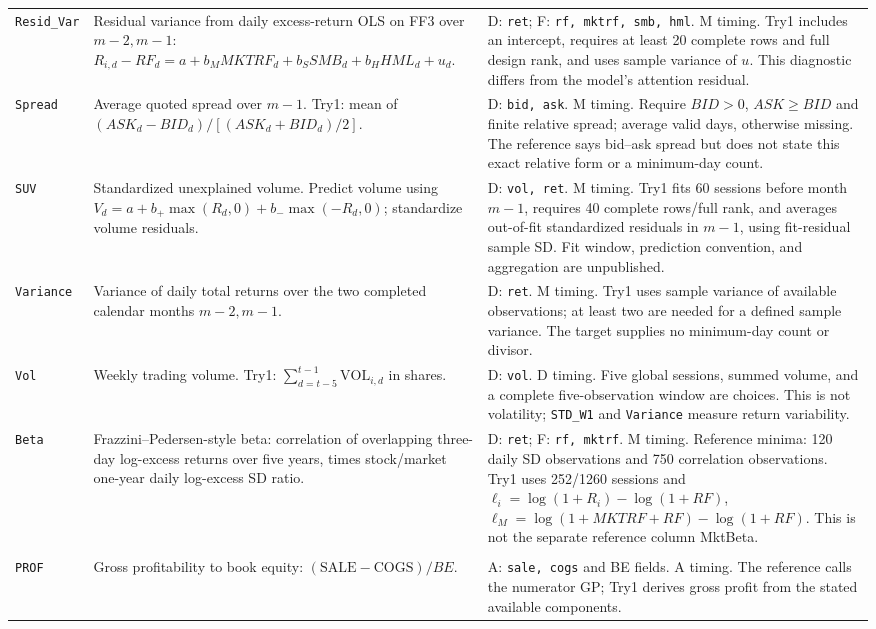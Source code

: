 \documentclass[11pt]{article}
\begin{document}
\begin{longtable}{@{}>{\raggedright\arraybackslash}p{}>{\raggedright\arraybackslash}p{}>{\raggedright\arraybackslash}p{}@{}}
\texttt{Resid\_Var} & Residual variance from daily excess-return OLS on FF3 over $m-2,m-1$: $R_{i,d}-RF_d=a+b_M MKTRF_d+b_S SMB_d+b_H HML_d+u_d$. & D: \texttt{ret}; F: \texttt{rf, mktrf, smb, hml}. M timing. Try1 includes an intercept, requires at least 20 complete rows and full design rank, and uses sample variance of $u$. This diagnostic differs from the model's attention residual. \\
\texttt{Spread} & Average quoted spread over $m-1$. Try1: mean of $(ASK_d-BID_d)/[(ASK_d+BID_d)/2]$. & D: \texttt{bid, ask}. M timing. Require $BID>0$, $ASK\ge BID$ and finite relative spread; average valid days, otherwise missing. The reference says bid--ask spread but does not state this exact relative form or a minimum-day count. \\
\texttt{SUV} & Standardized unexplained volume. Predict volume using $V_d=a+b_+\max(R_d,0)+b_-\max(-R_d,0)$; standardize volume residuals. & D: \texttt{vol, ret}. M timing. Try1 fits 60 sessions before month $m-1$, requires 40 complete rows/full rank, and averages out-of-fit standardized residuals in $m-1$, using fit-residual sample SD. Fit window, prediction convention, and aggregation are unpublished. \\
\texttt{Variance} & Variance of daily total returns over the two completed calendar months $m-2,m-1$. & D: \texttt{ret}. M timing. Try1 uses sample variance of available observations; at least two are needed for a defined sample variance. The target supplies no minimum-day count or divisor. \\
\texttt{Vol} & Weekly trading volume. Try1: $\sum_{d=t-5}^{t-1}\mathrm{VOL}_{i,d}$ in shares. & D: \texttt{vol}. D timing. Five global sessions, summed volume, and a complete five-observation window are choices. This is not volatility; \texttt{STD\_W1} and \texttt{Variance} measure return variability. \\
\texttt{Beta} & Frazzini--Pedersen-style beta: correlation of overlapping three-day log-excess returns over five years, times stock/market one-year daily log-excess SD ratio. & D: \texttt{ret}; F: \texttt{rf, mktrf}. M timing. Reference minima: 120 daily SD observations and 750 correlation observations. Try1 uses 252/1260 sessions and $\ell_i=\log(1+R_i)-\log(1+RF)$, $\ell_M=\log(1+MKTRF+RF)-\log(1+RF)$. This is not the separate reference column MktBeta. \\
\addlinespace
\multicolumn{3}{@{}l}{\textbf{Profitability: 7 characteristics}} \\*
\addlinespace
\texttt{PROF} & Gross profitability to book equity: $(\mathrm{SALE}-\mathrm{COGS})/BE$. & A: \texttt{sale, cogs} and BE fields. A timing. The reference calls the numerator GP; Try1 derives gross profit from the stated available components. \\

\end{longtable}
\end{document}
